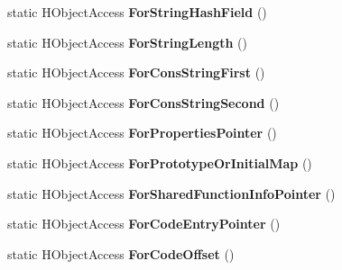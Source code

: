 \begin{DoxyCompactItemize}
\item 
\hypertarget{classv8_1_1internal_1_1_v8___f_i_n_a_l_abc8cfd5dd2422055d49633b726e60dc8}{}static H\+Object\+Access {\bfseries For\+String\+Hash\+Field} ()\label{classv8_1_1internal_1_1_v8___f_i_n_a_l_abc8cfd5dd2422055d49633b726e60dc8}

\item 
\hypertarget{classv8_1_1internal_1_1_v8___f_i_n_a_l_aeecd356b33c23e132e0f3eb34009e96e}{}static H\+Object\+Access {\bfseries For\+String\+Length} ()\label{classv8_1_1internal_1_1_v8___f_i_n_a_l_aeecd356b33c23e132e0f3eb34009e96e}

\item 
\hypertarget{classv8_1_1internal_1_1_v8___f_i_n_a_l_a9627b20ed6682a8993c393831371de87}{}static H\+Object\+Access {\bfseries For\+Cons\+String\+First} ()\label{classv8_1_1internal_1_1_v8___f_i_n_a_l_a9627b20ed6682a8993c393831371de87}

\item 
\hypertarget{classv8_1_1internal_1_1_v8___f_i_n_a_l_a3743e65b175d21b1ec978c1081b28005}{}static H\+Object\+Access {\bfseries For\+Cons\+String\+Second} ()\label{classv8_1_1internal_1_1_v8___f_i_n_a_l_a3743e65b175d21b1ec978c1081b28005}

\item 
\hypertarget{classv8_1_1internal_1_1_v8___f_i_n_a_l_a3a68334a385b5f44b482afb6103eb1da}{}static H\+Object\+Access {\bfseries For\+Properties\+Pointer} ()\label{classv8_1_1internal_1_1_v8___f_i_n_a_l_a3a68334a385b5f44b482afb6103eb1da}

\item 
\hypertarget{classv8_1_1internal_1_1_v8___f_i_n_a_l_a7d8d964cf77054127a564a9874c8a10f}{}static H\+Object\+Access {\bfseries For\+Prototype\+Or\+Initial\+Map} ()\label{classv8_1_1internal_1_1_v8___f_i_n_a_l_a7d8d964cf77054127a564a9874c8a10f}

\item 
\hypertarget{classv8_1_1internal_1_1_v8___f_i_n_a_l_a3898a1f532a297664c6bae99a289a345}{}static H\+Object\+Access {\bfseries For\+Shared\+Function\+Info\+Pointer} ()\label{classv8_1_1internal_1_1_v8___f_i_n_a_l_a3898a1f532a297664c6bae99a289a345}

\item 
\hypertarget{classv8_1_1internal_1_1_v8___f_i_n_a_l_aa9a50749d57ae106468a9caf7f0dce76}{}static H\+Object\+Access {\bfseries For\+Code\+Entry\+Pointer} ()\label{classv8_1_1internal_1_1_v8___f_i_n_a_l_aa9a50749d57ae106468a9caf7f0dce76}

\item 
\hypertarget{classv8_1_1internal_1_1_v8___f_i_n_a_l_a9d10e14cbf8a5c470c9642620732b672}{}static H\+Object\+Access {\bfseries For\+Code\+Offset} ()\label{classv8_1_1internal_1_1_v8___f_i_n_a_l_a9d10e14cbf8a5c470c9642620732b672}


\end{DoxyCompactItemize}
